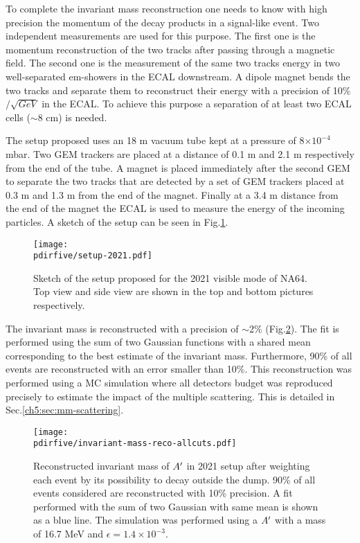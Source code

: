 To complete the invariant mass reconstruction one needs to know with high precision the momentum of the decay products in a signal-like event. Two independent measurements are used for this purpose. The first one is the momentum reconstruction of the two tracks after passing through a magnetic field. The second one is the measurement of the same two tracks energy in two well-separated em-showers in the ECAL downstream. A dipole magnet bends the two tracks and separate them to reconstruct their energy with a precision of 10\%$/\sqrt{GeV}$ in the ECAL. To achieve this purpose a separation of at least two ECAL cells ($\sim 8$ cm) is needed.

The setup proposed uses an 18 m vacuum tube kept at a pressure of 8$\times 10^{-4}$ mbar. Two GEM trackers \cite{gem} are placed at a distance of 0.1 m and 2.1 m respectively from the end of the tube. A magnet is placed immediately after the second GEM to separate the two tracks that are detected by a set of GEM trackers placed at 0.3 m and 1.3 m from the end of the magnet. Finally at a 3.4 m distance from the end of the magnet the ECAL is used to measure the energy of the incoming particles. A sketch of the setup can be seen in Fig.\ref{fig:setup-2021}.

\begin{figure}[tbh!]
  \centering
  \texttt{[image: \\pdirfive/setup-2021.pdf]}
  \caption[2021 setup]{Sketch of the setup proposed for the 2021 visible mode of NA64. Top view and side view are shown in the top and bottom pictures respectively.}
  \label{fig:setup-2021}
\end{figure}

The invariant mass is reconstructed with a precision of $\sim$2\% (Fig.\ref{fig:imassreco}). The fit is performed using the sum of two Gaussian functions with a shared mean corresponding to the best estimate of the invariant mass. Furthermore, 90\% of all events are reconstructed with an error smaller than 10\%. This reconstruction was performed using a MC simulation where all detectors budget was reproduced precisely to estimate the impact of the multiple scattering. This is detailed in Sec.\ref{ch5:sec:mm-scattering}.


\begin{figure}[tbh!]
  \centering
  \texttt{[image: \\pdirfive/invariant-mass-reco-allcuts.pdf]}
  \caption[Invariant mass reconstruction in 2021 setup]{Reconstructed invariant mass of $A'$ in 2021 setup after weighting each event by its possibility to decay outside the dump. 90\% of all events considered are reconstructed with 10\% precision. A fit performed with the sum of two Gaussian with same mean is shown as a blue line. The simulation was performed using a $A'$ with a mass of 16.7 MeV and $\epsilon = 1.4\times10^{-3}$.}
    \label{fig:imassreco}
  \end{figure}

